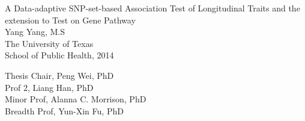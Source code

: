 \documentclass[12pt]{article}
\begin{document}
\newpage
\thispagestyle{empty}
\doublespacing
\begin{center}
{\normalsize  A Data-adaptive SNP-set-based Association Test of Longitudinal Traits and the extension to Test on Gene Pathway}\\[2.3cm]
\singlespacing
Yang Yang, M.S\\
The University of Texas\\
School of Public Health, 2014
\end{center}

\doublespacing
\noindent
Thesis Chair, Peng Wei, PhD\\
\indent
Prof 2, Liang Han, PhD\\
Minor Prof, Alanna C. Morrison, PhD\\ 
Breadth Prof, Yun-Xin Fu, PhD



\newpage
\tableofcontents

\newpage
\listoftables

\newpage
\listoffigures
 

\newpage
\end{document}
